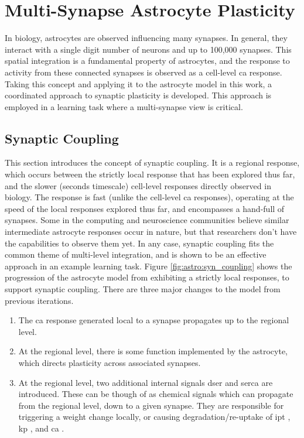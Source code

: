 \documentclass[conference]{IEEEtran}
\newcommand{\ca}{\gls{ca}\textrm{ }}
\newcommand{\ipt}{\gls{ipt}\textrm{ }}
\newcommand{\kp}{\gls{kp}\textrm{ }}
\newcommand{\dser}{\gls{dser}\textrm{ }}
\newcommand{\serca}{\gls{serca}\textrm{ }}
\begin{document}
\section{Multi-Synapse Astrocyte Plasticity}

In biology, astrocytes are observed influencing many synapses. In general, they
interact with a single digit number of neurons and up to 100,000 synapses. This
spatial integration is a fundamental property of astrocytes, and the response to
activity from these connected synapses is observed as a cell-level \ca
response. Taking this concept and applying it to the astrocyte model in this
work, a coordinated approach to synaptic plasticity is developed. This approach
is employed in a learning task where a multi-synapse view is critical.

\subsection{Synaptic Coupling}
This section introduces the concept of synaptic coupling. It is a regional
response, which occurs between the strictly local response that has been
explored thus far, and the slower (seconds timescale) cell-level responses
directly observed in biology. The response is fast (unlike the cell-level \ca
responses), operating at the speed of the local responses explored thus far, and
encompasses a hand-full of synapses. Some in the computing and neuroscience
communities believe similar intermediate astrocyte responses occur in nature,
but that researchers don't have the capabilities to observe them yet. In any
case, synaptic coupling fits the common theme of multi-level integration, and is
shown to be an effective approach in an example learning task. Figure
\ref{fig:astro:syn_coupling} shows the progression of the astrocyte model from
exhibiting a strictly local responses, to support synaptic coupling. There are
three major changes to the model from previous iterations.

\begin{enumerate}
\item The \ca response generated local to a synapse propagates up to the
  regional level.
\item At the regional level, there is some function implemented by the
  astrocyte, which directs plasticity across associated synapses.
\item At the regional level, two additional internal signals \dser and
  \serca are introduced. These can be though of as chemical signals which can
  propagate from the regional level, down to a given synapse. They are
  responsible for triggering a weight change locally, or causing
  degradation/re-uptake of \ipt, \kp, and \ca.
\end{enumerate}
\end{document}
